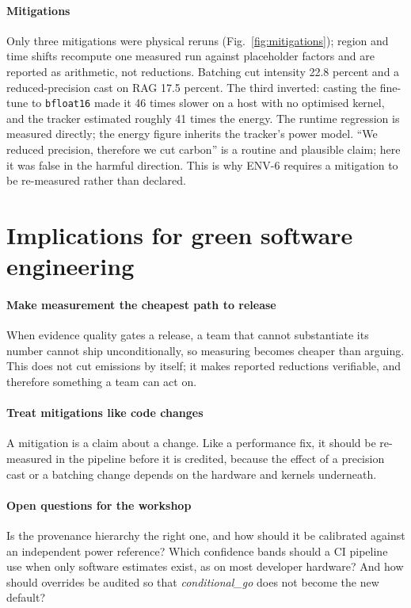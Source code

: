\documentclass[10pt,conference]{IEEEtran}
\begin{document}
\paragraph{Mitigations} Only three mitigations were physical reruns
(Fig.~\ref{fig:mitigations}); region and time shifts recompute one measured run
against placeholder factors and are reported as arithmetic, not reductions.
Batching cut intensity 22.8 percent and a reduced-precision cast on RAG 17.5
percent. The third inverted: casting the fine-tune to \texttt{bfloat16} made it
46 times slower on a host with no optimised kernel, and the tracker estimated
roughly 41 times the energy. The runtime regression is measured directly; the
energy figure inherits the tracker's power model. ``We reduced precision,
therefore we cut carbon'' is a routine and plausible claim; here it was false
in the harmful direction. This is why ENV-6 requires a mitigation to be
re-measured rather than declared.

\section{Implications for green software engineering}

\paragraph{Make measurement the cheapest path to release} When evidence
quality gates a release, a team that cannot substantiate its number cannot ship
unconditionally, so measuring becomes cheaper than arguing. This does not cut
emissions by itself; it makes reported reductions verifiable, and therefore
something a team can act on.

\paragraph{Treat mitigations like code changes} A mitigation is a claim about a
change. Like a performance fix, it should be re-measured in the pipeline before
it is credited, because the effect of a precision cast or a batching change
depends on the hardware and kernels underneath.

\paragraph{Open questions for the workshop} Is the provenance hierarchy the
right one, and how should it be calibrated against an independent power
reference? Which confidence bands should a CI pipeline use when only software
estimates exist, as on most developer hardware? And how should overrides be
audited so that \emph{conditional\_go} does not become the new default?
\end{document}
